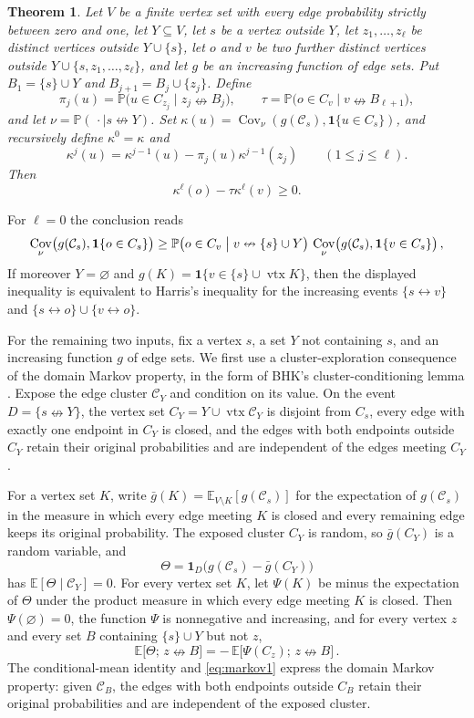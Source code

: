\documentclass[11pt]{article}
\newtheorem{theorem}{Theorem}[section]
\theoremstyle{definition}
\theoremstyle{remark}
\newcommand{\PP}{\mathbb P}
\newcommand{\EE}{\mathbb E}
\newcommand{\one}{\mathbf 1}
\newcommand{\con}{\leftrightarrow}
\newcommand{\ncon}{\nleftrightarrow}
\newcommand{\eC}{\mathcal C}
\DeclareMathOperator{\Cov}{Cov}
\DeclareMathOperator{\vtx}{vtx}
\begin{document}
\begin{theorem}\label{thm:csh}
Let $V$ be a finite vertex set with every edge probability strictly between zero and one, let
$Y\subseteq V$, let $s$ be a vertex outside $Y$, let $z_1,\dots,z_\ell$ be distinct
vertices outside $Y\cup\{s\}$, let $o$ and $v$ be two further distinct vertices outside
$Y\cup\{s,z_1,\dots,z_\ell\}$, and let $g$ be an increasing function of edge sets.
Put $B_1=\{s\}\cup Y$ and $B_{j+1}=B_j\cup\{z_j\}$. Define
\[
 \pi_j(u)=\PP\bigl(u\in C_{z_j}\mid z_j\ncon B_j\bigr),\qquad
 \tau=\PP\bigl(o\in C_v\mid v\ncon B_{\ell+1}\bigr),
\]
and let $\nu=\PP(\,\cdot\mid s\ncon Y)$. Set
$\kappa(u)=\Cov_\nu(g(\eC_s),\one\{u\in C_s\})$, and recursively define
$\kappa^0=\kappa$ and
\[
 \kappa^j(u)=\kappa^{j-1}(u)-\pi_j(u)\kappa^{j-1}(z_j)
 \qquad (1\leq j\leq\ell).
\]
Then
\[
 \kappa^\ell(o)-\tau\kappa^\ell(v)\geq0.
\]
\end{theorem}

For $\ell=0$ the conclusion reads
\[
 \Cov_\nu\bigl(g(\eC_s),\one\{o\in C_s\}\bigr)\geq
 \PP\bigl(o\in C_v\bigm|v\ncon\{s\}\cup Y\bigr)\,\Cov_\nu\bigl(g(\eC_s),\one\{v\in C_s\}\bigr)\,,
\]
If moreover $Y=\varnothing$ and
$g(K)=\one\{v\in\{s\}\cup\vtx K\}$, then the displayed inequality is equivalent to Harris's
inequality for the increasing events $\{s\con v\}$ and
$\{s\con o\}\cup\{v\con o\}$.

For the remaining two inputs, fix a vertex $s$, a set $Y$ not containing $s$, and an
increasing function $g$ of edge sets. We first use a cluster-exploration consequence of
the domain Markov property, in the form of BHK's cluster-conditioning lemma
\cite[Lemma~2.4]{BHK}. Expose the edge cluster $\eC_Y$ and condition on its value. On the event $D=\{s\ncon Y\}$, the vertex set
$C_Y=Y\cup\vtx\eC_Y$ is disjoint from $C_s$, every edge with exactly one endpoint in
$C_Y$ is closed, and the edges with both endpoints outside $C_Y$ retain their original
probabilities and are independent of the edges
meeting $C_Y$.

For a vertex set $K$, write $\bar g(K)=\EE_{V\setminus K}[g(\eC_s)]$ for the expectation of
$g(\eC_s)$ in the measure in which every edge meeting $K$ is closed and every remaining edge
keeps its original probability. The exposed cluster $C_Y$ is random, so $\bar g(C_Y)$ is a
random variable, and
\begin{equation}\label{eq:resid}
 \Theta=\one_D\bigl(g(\eC_s)-\bar g(C_Y)\bigr)
\end{equation}
has $\EE[\Theta\mid\eC_Y]=0$. For every vertex set $K$, let
$\Psi(K)$ be minus the expectation of $\Theta$ under the product measure in which every edge meeting
$K$ is closed. Then $\Psi(\varnothing)=0$, the function $\Psi$ is nonnegative and
increasing, and for every vertex $z$ and every set $B$ containing $\{s\}\cup Y$ but not $z$,
\begin{equation}\label{eq:markov1}
 \EE\bigl[\Theta;\,z\ncon B\bigr]=-\,\EE\bigl[\Psi(C_z);\,z\ncon B\bigr]\,.
\end{equation}
The conditional-mean identity and \eqref{eq:markov1} express the domain Markov property:
given $\eC_B$, the edges with both endpoints outside $C_B$ retain their original
probabilities and are independent of the exposed cluster.
\end{document}
